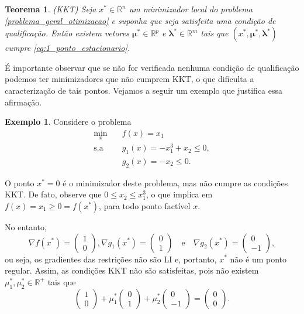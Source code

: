 \documentclass[12pt,a4paper]{scrartcl}
\def\RR{\mathds{R}}
\newtheorem{teo}{Teorema}
\theoremstyle{definition}%
\newtheorem{exem}{Exemplo}
\begin{document}
\begin{teo}(\emph{KKT}) Seja $x^{*} \in \RR^{n}$ um minimizador local do problema \eqref{problema_geral_otimizacao} e suponha que seja satisfeita uma condição de qualificação. Então existem vetores $\boldsymbol{\mu}^{*} \in \RR^{p}$ e $\boldsymbol{\lambda}^{*} \in \RR^{m}$ tais que $(x^{*} , \boldsymbol{\mu}^{*} , \boldsymbol{\lambda}^{*} )$ cumpre \eqref{eq:1_ponto_estacionario}.
\end{teo}

É importante observar que se não for verificada nenhuma condição de qualificação podemos ter minimizadores que não cumprem KKT, o que dificulta a caracterização de tais pontos. Vejamos a seguir um exemplo que justifica essa afirmação.

\begin{exem}
Considere o problema 
\[
\begin{aligned}
\min_{x} & \quad f(x)=x_{1} \\
\text{s.a} & \quad g_{1}(x)=-x_{1}^{3} + x_{2} \leq 0 , \\
& \quad g_{2}(x) = -x_{2} \leq 0.
\end{aligned}
\]

O ponto $x^{*} = 0$ é o minimizador deste problema, mas não cumpre as condições KKT. De fato, observe que $0\leq x_{2} \leq x_{1}^{3}$, o que implica em $f(x)= x_{1} \geq 0 = f(x^{*})$, para todo ponto factível $x$.

No entanto, 
\[
\nabla f(x^{*}) = \left( \begin{array}{cc} 1 \\ 0 \end{array} \right) , \nabla g_{1}(x^{*}) = \left( \begin{array}{cc} 0 \\ 1 \end{array} \right) \quad \text{e} \quad \nabla g_{2}(x^{*}) = \left( \begin{array}{cc} 0 \\ -1 \end{array} \right) ,
\]
ou seja, os gradientes das restrições não são LI e, portanto, $x^{*}$ não é um ponto regular. Assim, as condições KKT não são satisfeitas, pois não existem $\mu_{1}^{*} , \mu_{2}^{*} \in \RR^{+}$ tais que 
\[
\left( \begin{array}{cc} 1 \\ 0 \end{array} \right) + \mu_{1}^{*} \left( \begin{array}{cc} 0 \\ 1 \end{array} \right) + \mu_{2}^{*} \left( \begin{array}{cc} 0 \\ -1 \end{array} \right) = \left( \begin{array}{cc} 0 \\ 0 \end{array} \right) .
\]
\end{exem}
\end{document}
